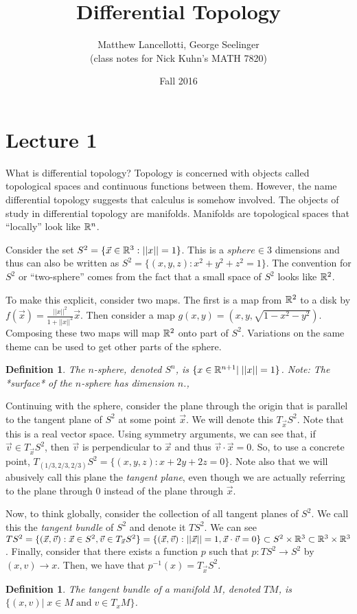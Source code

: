 \documentclass[11pt,leqno,oneside]{amsart}
\title[Differential Topology]{Differential Topology}
\author{Matthew Lancellotti, George Seelinger\\ (class notes for Nick Kuhn's MATH 7820)}
\date{Fall 2016}
\newcommand{\de}{\emph}
\theoremstyle{mystyle} \newtheorem{thrm}[thm]{Theorem}
\theoremstyle{mystyle} \newtheorem{defi}[thm]{Definition}
\begin{document}
\maketitle
\section{Lecture 1}

What is differential topology? Topology is concerned with objects called
topological spaces and continuous functions between them. However, the name
differential topology suggests that calculus is somehow involved. The objects of
study in differential topology are manifolds. Manifolds are topological spaces
that ``locally'' look like ${\mathbb R}^n$.
\begin{example}
	Consider the set $S^2 = \{ \vec{x} \in {\mathbb R}^3: ||x||=1\}$. This is a $sphere \in 3$ dimensions and thus can also be written as $S^2 = \{(x,y,z) :
	x^2+y^2+z^2=1\}$. The convention for $S^2$ or ``two-sphere'' comes from the
	fact that a small space of $S^2$ looks like ${\mathbb R}^2$.

	To make this explicit, consider two maps. The first is a map from ${\mathbb R}^2$ to
	a disk by $f(\vec{x}) = \frac{||x||^2}{1+||x||^2} \vec{x}$. Then consider a
	map $g(x,y) = (x,y,\sqrt{1-x^2-y^2})$. Composing these two maps will map
	${\mathbb R}^2$ onto part of $S^2$. Variations on the same theme can be used to get
	other parts of the sphere.
\end{example}
\begin{defi}
	The \de{$n$-sphere}, denoted $S^n$, is $\{x \in {\mathbb R}^{n+1} |\; ||x||=1 \}$. Note: The *surface* of the $n$-sphere has dimension $n$.,
\end{defi}
\begin{example}
	Continuing with the sphere, consider the plane through the origin that is parallel to the tangent plane of $S^2$ at some
	point $\vec{x}$. We will denote this $T_{\vec{x}}S^2$. Note that this is a
	real vector space. Using symmetry arguments, we can see that, if $\vec{v}
	\in T_{\vec{x}}S^2$, then $\vec{v}$ is perpendicular to $\vec{x}$ and thus
	$\vec{v} \cdot \vec{x} = 0$. So, to use a concrete point,
	$T_{(1/3,2/3,2/3)} S^2 = \{(x,y,z) : x+2y+2z=0\}$.  Note also that we will abusively call this plane the \de{tangent plane}, even though we are actually referring to the plane through $0$ instead of the plane through $\vec{x}$.
\end{example}
\begin{example}
	Now, to think globally, consider the collection of all tangent planes of
	$S^2$. We call this the \de{tangent bundle} of $S^2$ and denote it
	$TS^2$. We can see $TS^2 = \{(\vec{x}, \vec{v}): \vec{x} \in S^2, \vec{v}
	\in T_{\vec{x}} S^2\} = \{(\vec{x},\vec{v}) : ||\vec{x}|| = 1, \vec{x}
	\cdot \vec{v} = 0\} \subset S^2 \times {\mathbb R}^3 \subset {\mathbb R}^3 \times {\mathbb R}^3$.
	Finally, consider that there exists a function $p$ such that $p: TS^2 \to
	S^2$ by $(x,v) \to x$. Then, we have that $p^{-1}(x) = T_{\vec{x}}S^2$.
\end{example}
\begin{defi}
	The \de{tangent bundle} of a manifold $M$, denoted $TM$, is $\{ (x,v) |\; x \in M \;\text{and}\; v \in T_xM \}$.
\end{defi}
\end{document}
